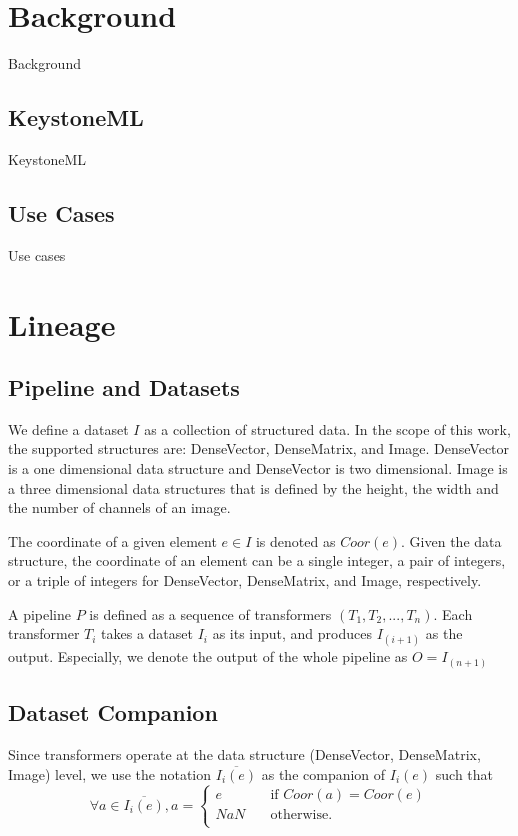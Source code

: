 \documentclass{sig-alternate}
\begin{document}
\section{Background}
\label{sec:Background}
Background

\subsection{KeystoneML}
KeystoneML

\subsection{Use Cases}
Use cases

\section{Lineage}
\label{sec:Lin}
\subsection{Pipeline and Datasets}
We define a dataset $I$ as a collection of structured data. In the scope of this work, the supported structures are: 
DenseVector, DenseMatrix, and Image. DenseVector is a one dimensional data structure and DenseVector is
two dimensional. Image is a three dimensional data structures that is defined by the height, the width and the number
of channels of an image.

The coordinate of a given element $e \in I$ is denoted as $Coor(e)$. Given the data structure, the coordinate of an
element can be a single integer, a pair of integers, or a triple of integers for DenseVector, DenseMatrix, and Image, respectively.

A pipeline $P$ is defined as a sequence of transformers $(T_1, T_2, ..., T_n)$. 
Each transformer $T_i$ takes a dataset $I_i$ as its input, and produces $I_{(i+1)}$ as the output. 
Especially, we denote the output of the whole pipeline as $O = I_{(n+1)}$

\subsection{Dataset Companion}
Since transformers operate at the data structure (DenseVector, DenseMatrix, Image) level, we use the notation
$\overline{I_i(e)}$ as the companion of $I_i(e)$ such that 
\[ \forall a \in \overline{I_i(e)}, a =
  \begin{cases}
    e       & \quad \text{if } Coor(a) = Coor(e)\\
    NaN  & \quad \text{otherwise}. \\
  \end{cases}
\]
\end{document}
